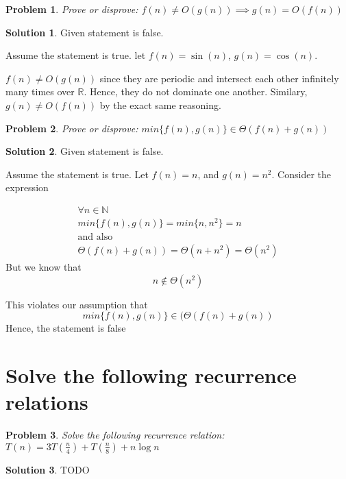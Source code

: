 \documentclass[12pt]{article}
\newtheorem*{problem}{Problem}
\theoremstyle{definition}
\newtheorem*{solution}{Solution}
\begin{document}
\begin{problem}
Prove or disprove: $f(n) \neq O(g(n)) \implies g(n) = O(f(n))$
\end{problem}
\begin{solution}
	Given statement is false.
	
	Assume the statement is true. let $f(n) = \sin(n)$, $g(n) = \cos(n)$.
	
	$f(n) \neq O(g(n))$ since they are periodic and intersect each other
	infinitely many times over $\mathbb R$. Hence, they do not dominate
	one another. Similary, $g(n) \neq O(f(n))$ by the exact same reasoning.
\end{solution}


\begin{problem}
Prove or disprove: $min \{ f(n), g(n) \} \in \Theta(f(n) + g(n))$
\end{problem}
\begin{solution}
	Given statement is false.
	
	Assume the statement is true. Let $f(n) = n$, and $g(n) = n^2$. Consider the expression
	
	\begin{gather*}
	\forall n \in \mathbb N \\
	min \{f(n), g(n) \} = min \{n, n^{2} \} = n \\
	\text{and also} \\
	\Theta(f(n) + g(n)) = \Theta(n + n^{2}) = \Theta(n^{2})
	\end{gather*}
But we know that
$$
n \notin \Theta(n^{2})
$$

This violates our assumption that 
$$
min \{ f(n), g(n) \} \in (\Theta(f(n) + g(n))
$$
Hence, the statement is false
\end{solution}

\section{Solve the following recurrence relations}
\begin{problem}
Solve the following recurrence relation: $T(n) = 3T(\frac n 4) + T(\frac n 8) + n \log n$
\end{problem}
\begin{solution}
	TODO
\end{solution}
\end{document}
